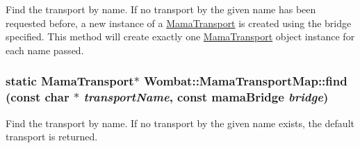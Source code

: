 Find the transport by name. If no transport by the given name has been requested before, a new instance of a \hyperlink{classWombat_1_1MamaTransport}{MamaTransport} is created using the bridge specified. This method will create exactly one \hyperlink{classWombat_1_1MamaTransport}{MamaTransport} object instance for each name passed. \hypertarget{classWombat_1_1MamaTransportMap_a02903ae89e1e885de4863342a475c573}{
\subsubsection[{find}]{\setlength{\rightskip}{0pt plus 5cm}static {\bf MamaTransport}$\ast$ Wombat::MamaTransportMap::find (const char $\ast$ {\em transportName}, \/  const mamaBridge {\em bridge})}}
\label{classWombat_1_1MamaTransportMap_a02903ae89e1e885de4863342a475c573}


Find the transport by name. If no transport by the given name exists, the default transport is returned. 